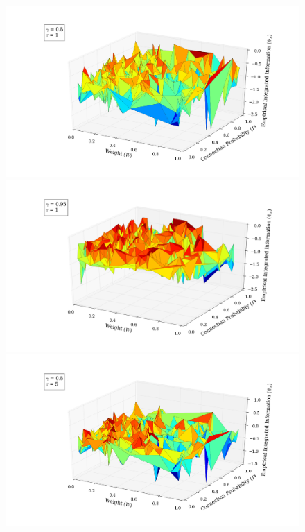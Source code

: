 \documentclass[a4paper,11pt]{article}
\begin{document}
\begin{figure}[H] 
	\begin{minipage}[b]{0.5\linewidth}
		\begin{center}
		\includegraphics[scale = 0.2]{figures/snn/p_w_phi_8_1}
		\end{center}
		\vspace{4ex}
	\end{minipage}
	\begin{minipage}[b]{0.5\linewidth}
		\begin{center}
		\includegraphics[scale = 0.2]{figures/snn/p_w_phi_95_1}
		\end{center}
		\vspace{4ex}
	\end{minipage}
	\begin{minipage}[b]{0.5\linewidth}
		\begin{center}
		\includegraphics[scale = 0.2]{figures/snn/p_w_phi_8_5}

\end{center}
\end{minipage}
\end{figure}
\end{document}

